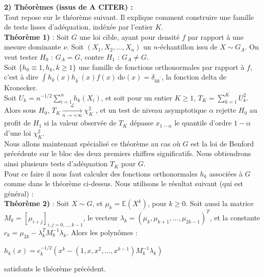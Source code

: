 \documentclass[12pt,a4paper]{article}
\begin{document}
\textbf{2) Théorèmes (issus de A CITER) :}
\\

Tout repose sur le théorème suivant. Il explique comment construire une famille de tests lisses d'adéquation, indéxée par l'entier $K$. \\

\textbf{Théorème 1)} : Soit $G$ une loi cible, ayant pour densité $f$ par rapport à une mesure dominante $\nu$. Soit $(X_{1}, X_{2}, ..., X_{n})$ un $n$-échantillon issu de $X \sim G_{A}$. On veut tester $H_{0}$ : $G_{A} = G$, contre $H_{1}$ : $G_{A} \ne G$. \\

Soit $\{ h_{0} \equiv 1, h_{k}, k \geq 1 \}$ une famille de fonctions orthonormales par rapport à $f$, c'est à dire $\displaystyle \int h_{k}(x)h_{k^{'}}(x)f(x) \, \mathrm{d \nu}(x) = \delta_{kk^{'}}$, la fonction delta de Kronecker. \\
Soit $U_{k} = n^{-1/2} \sum \limits_{i=1}^{n} h_{k}(X_{i}) $, et soit pour un entier $K \geq1$, $T_{K} = \sum \limits_{k=1}^{K} U_{k}^{2}$. \\ 
Alors sous $H_{0}$, $T_{K} \xrightarrow[n \to +\infty]{\mathcal{L}} \chi_{K}^{2}$ , et un test de niveau asymptotique $\alpha$ rejette $H_{0}$ au profit de $H_{1}$ si la valeur observée de $T_{K}$ dépasse $x_{1- \alpha}$ le quantile d'ordre $1- \alpha$ d'une loi $\chi_{K}^{2}$. \\

Nous allons maintenant spécialisé ce théorème au cas où $G$ est la loi de Benford précédente sur le bloc des deux premiers chiffres significatifs. Nous obtiendrons ainsi plusieurs tests d'adéquation $T_{K}$ pour $G$. \\
Pour ce faire il nous faut calculer des fonctions orthonormales $h_{k}$ associées à $G$ comme dans le théorème ci-dessus. Nous utilisons le résultat suivant (qui est général) : \\

\textbf{Théorème 2)} : Soit $X \sim G$, et $\mu_{k} = \mathbb{E}(X^{k})$, pour $k \geq0$. Soit aussi la matrice $M_{k} = [\mu_{i+j}]_{i,j=0,...,k-1}$, le vecteur $\lambda_{k} = (\mu_{k}, \mu_{k+1}, ..., \mu_{2k-1})^{T}$, et la constante $c_{k} = \mu_{2k} - \lambda_{k}^{T} M_{k}^{-1} \lambda_{k}$. Alors les polynômes :
\begin{center}
$h_{k}(x) = c_{k}^{-1/2} ( x^{k} - (1,x,x^{2},...,x^{k-1}) M_{k}^{-1} \lambda_{k} )$
\end{center}
satisfonts le théorème précédent. \\
\end{document}
